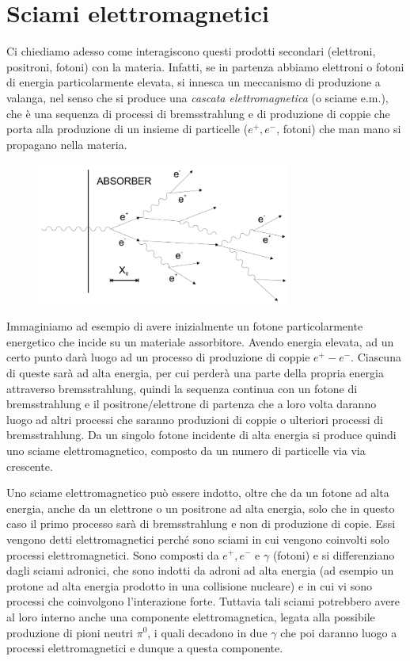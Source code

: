\section{Sciami elettromagnetici}

Ci chiediamo adesso come interagiscono questi prodotti secondari (elettroni, positroni, fotoni) con la materia. Infatti, se in partenza abbiamo elettroni o fotoni di energia particolarmente elevata, si innesca un meccanismo di produzione a valanga, nel senso che si produce una \textit{cascata elettromagnetica} (o sciame e.m.), che è una sequenza di processi di bremsstrahlung e di produzione di coppie che porta alla produzione di un insieme di particelle ($e^+, e^-$, fotoni) che man mano si propagano nella materia.

\begin{figure}[H]
    \centering
    \includegraphics[width=0.75\textwidth]{immagini/sciame_elettromagnetico.png}
\end{figure}

Immaginiamo ad esempio di avere inizialmente un fotone particolarmente energetico che incide su un materiale assorbitore. Avendo energia elevata, ad un certo punto darà luogo ad un processo di produzione di coppie $e^+ - e^-$. Ciascuna di queste sarà ad alta energia, per cui perderà una parte della propria energia attraverso bremsstrahlung, quindi la sequenza continua con un fotone di bremsstrahlung e il positrone/elettrone di partenza che a loro volta daranno luogo ad altri processi che saranno produzioni di coppie o ulteriori processi di bremsstrahlung. Da un singolo fotone incidente di alta energia si produce quindi uno sciame elettromagnetico, composto da un numero di particelle via via crescente.

Uno sciame elettromagnetico può essere indotto, oltre che da un fotone ad alta energia, anche da un elettrone o un positrone ad alta energia, solo che in questo caso il primo processo sarà di bremsstrahlung e non di produzione di copie. Essi vengono detti elettromagnetici perché sono sciami in cui vengono coinvolti solo processi elettromagnetici. Sono composti da $e^+,e^-$ e $\gamma$ (fotoni) e si differenziano dagli sciami adronici, che sono indotti da adroni ad alta energia (ad esempio un protone ad alta energia prodotto in una collisione nucleare) e in cui vi sono processi che coinvolgono l'interazione forte. Tuttavia tali sciami potrebbero avere al loro interno anche una componente elettromagnetica, legata alla possibile produzione di pioni neutri $\pi^0$, i quali decadono in due $\gamma$ che poi daranno luogo a processi elettromagnetici e dunque a questa componente.

